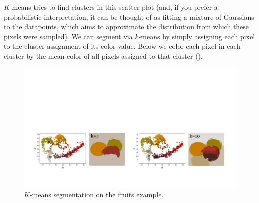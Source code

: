 $K$-means tries to find clusters in this scatter plot (and, if you prefer a probabilistic interpretation, it can be thought of as fitting a mixture of Gaussians to the datapoints, which aims to approximate the distribution from which these pixels were sampled). We can segment via $k$-means by simply assigning each pixel to the cluster assignment of its color value. Below we color each pixel in each cluster by the mean color of all pixels assigned to that cluster (\fig{\ref{fig:perceptual_organization:kmeans_ab_fruits2}}).
\vspace{-0.4cm}
\begin{figure}[h!]
    \centerline{
    \includegraphics[width=1.0\linewidth]{./figures/perceptual_organization/kmeans_ab_fruits2.pdf}
    }
    \caption{$K$-means segmentation on the fruits example.}
    \label{fig:perceptual_organization:kmeans_ab_fruits2}
\end{figure}

